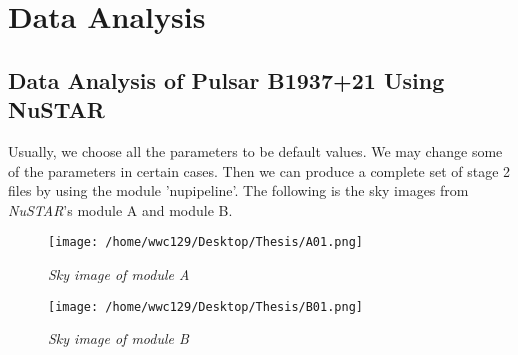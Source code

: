 \documentclass[12pt]{report}
\begin{document}
            



            
           

\chapter{Data Analysis}
    
    
    \section{Data Analysis of Pulsar B1937+21 Using NuSTAR}
        Usually, we choose all the parameters to be default values. We may change some of the parameters in certain 
        cases. 
        Then we can produce a complete set of stage 2 files by using the module 'nupipeline'. The following is 
        the sky images from \textit{NuSTAR}'s module A and module B. 
        \begin{figure}[h]
          \hspace{0.7cm}
          \begin{minipage}{0.45\textwidth} 
            \centering 
            \texttt{[image: /home/wwc129/Desktop/Thesis/A01.png]}
            \caption{\textit{\footnotesize Sky image of module A}}
          \end{minipage}
          \hspace{0.1cm} 
          \begin{minipage}{0.45\textwidth}
            \centering 
            \texttt{[image: /home/wwc129/Desktop/Thesis/B01.png]}
            \caption{\textit{\footnotesize Sky image of module B}}
          \end{minipage}
        \end{figure}
      
\end{document}
